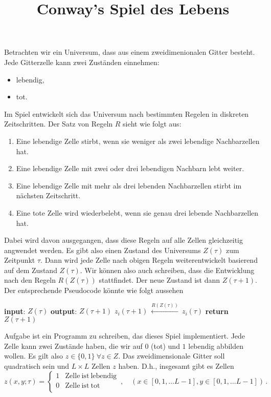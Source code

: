 \documentclass{article}[12pt]
\title{Conway's Spiel des Lebens}
\begin{document}
\maketitle


\noindent Betrachten wir ein \glqq Universum\grqq, dass aus einem zweidimenionalen Gitter besteht.
Jede Gitterzelle kann zwei Zuständen einnehmen:
\begin{itemize}
\item lebendig,
\item tot.
\end{itemize}
Im Spiel entwickelt sich das Universum nach bestimmten Regelen in diskreten Zeitschritten.
Der Satz von Regeln $R$ sieht wie folgt aus:
\begin{enumerate}
\item Eine lebendige Zelle stirbt, wenn sie weniger als zwei lebendige Nachbarzellen hat.
\item Eine lebendige Zelle mit zwei oder drei lebendigen Nachbarn lebt weiter.
\item Eine lebendige Zelle mit mehr als drei lebenden Nachbarzellen stirbt im nächsten Zeitschritt.
\item Eine tote Zelle wird wiederbelebt, wenn sie genau drei lebende Nachbarzellen hat.
\end{enumerate}
Dabei wird davon ausgegangen, dass diese Regeln auf alle Zellen gleichzeitig angwendet werden.
Es gibt also einen Zustand des Universums $Z(\tau)$ zum Zeitpunkt $\tau$.
Dann wird jede Zelle nach obigen Regeln weiterentwickelt basierend auf dem Zustand $Z(\tau)$.
Wir können also auch schreiben, dass die Entwicklung nach den Regeln $R(Z(\tau))$ stattfindet. 
Der neue Zustand ist dann $Z(\tau+1)$. 
Der entsprechende Pseudocode könnte wie folgt aussehen
\begin{algorithmic}[1]
  \State \textbf{input}: $Z(\tau)$
  \State \textbf{output}: $Z(\tau+1)$
  \State $z_i(\tau+1)\ \stackrel{R(Z(\tau))}{\longleftarrow}\ z_i(\tau)$
  \EndFor
  \State \textbf{return} $Z(\tau+1)$
  \EndProcedure
\end{algorithmic}
Aufgabe ist ein Programm zu schreiben, das dieses Spiel implementiert.
Jede Zelle kann zwei Zustände haben, die wir auf $0$ (tot) und $1$ lebendig abbilden wollen.
Es gilt also $z \in \{0,1\}\ \forall z\in Z$.
Das zweidimensionale Gitter soll quadratisch sein und $L\times L$ Zellen $z$ haben.
D.h., insgesamt gibt es Zellen
\begin{equation}
  z(x,y; \tau) = \begin{cases}
    1 & \mathrm{Zelle~ist~lebendig} \\0  & \mathrm{Zelle~ist~tot} \\
  \end{cases}
  \,,\quad (x\in[0,1,\ldots L-1], y\in[0,1,\ldots L-1])\,.
\end{equation}
\end{document}
